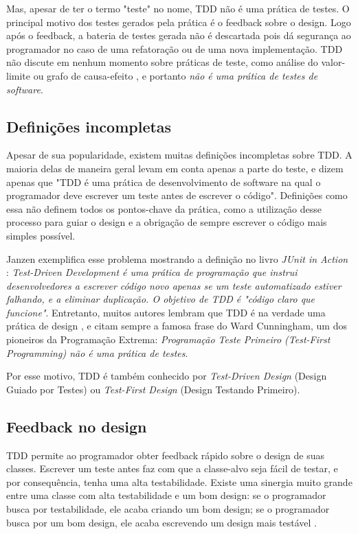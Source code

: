 Mas, apesar de ter o termo "teste" no nome, TDD não é uma prática de testes. O principal motivo dos testes gerados pela prática é o
feedback sobre o design. Logo após o feedback, a bateria de testes gerada não é descartada pois dá segurança ao programador no caso de uma refatoração
ou de uma nova implementação. TDD não discute em nenhum momento sobre práticas de teste, como análise do valor-limite ou
grafo de causa-efeito \cite{art-of-sw-testing}, e portanto \textit{não é uma prática de testes de software}.

\subsection{Definições incompletas} 
\label{sec:tdd-definicoes-incompletas}

Apesar de sua popularidade, existem muitas definições incompletas sobre TDD. A maioria delas de maneira geral levam em conta
apenas a parte do teste, e dizem apenas
que "TDD é uma prática de desenvolvimento de software na qual o programador deve escrever um teste antes de escrever o código".
Definições como essa não definem todos os pontos-chave da prática, como a utilização desse processo para guiar o design e
a obrigação de sempre escrever o código mais simples possível.

Janzen \cite{tdd-taxonomy} exemplifica esse problema mostrando a definição no livro \textit{JUnit in Action} \cite{junit-in-action}:
\textit{Test-Driven Development é uma prática de programação que instrui desenvolvedores a escrever código novo apenas se um teste
automatizado estiver falhando, e a eliminar duplicação. O objetivo de TDD é "código claro que funcione"}. 
Entretanto, muitos autores lembram que TDD é na verdade uma prática de design \cite{tdd-taxonomy} \cite{aim-fire}, 
e citam sempre a famosa frase do Ward Cunningham, um dos pioneiros da Programação Extrema:
\textit{Programação Teste Primeiro (Test-First Programming) não é uma prática de testes}. 

Por esse motivo, TDD é também conhecido por \textit{Test-Driven Design} (Design Guiado por Testes) ou \textit{Test-First Design}
(Design Testando Primeiro).

\subsection{Feedback no design}

TDD permite ao programador obter feedback rápido sobre o design de suas classes. Escrever um teste antes faz com que
a classe-alvo seja fácil de testar, e por consequência, tenha uma alta testabilidade. Existe uma sinergia muito
grande entre uma classe com alta testabilidade e um bom design: se o programador busca por testabilidade,
ele acaba criando um bom design; se o programador busca por um bom design, ele acaba escrevendo um design mais testável \cite{feathers-synergy}.  

